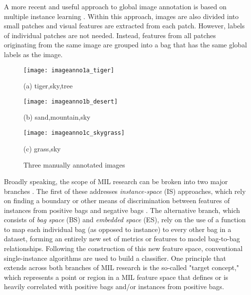 \documentclass[12pt,dvips]{report}
\numberwithin{equation}{section}
\begin{document}
A more recent and useful approach to global image annotation is based on multiple instance learning \cite{andrews2002support,ray2005supervised,chen06_miles,mcil14}.  Within this approach, images are also divided into small patches and visual features are extracted from each patch.  However, labels of individual patches are not needed.  Instead, features from all patches originating from the same image are grouped into a bag that has the same global labels as the image.  


\begin{figure}[htb]
\begin{minipage}[b]{.31\linewidth}
  \centering
  \centerline{\texttt{[image: imageanno1a\_tiger]}}
  \centerline{(a) tiger,sky,tree}
\end{minipage}
\begin{minipage}[b]{0.31\linewidth}
  \centering
  \centerline{\texttt{[image: imageanno1b\_desert]}}
  \centerline{(b) sand,mountain,sky}
\end{minipage}
\begin{minipage}[b]{0.31\linewidth}
  \centering
  \centerline{\texttt{[image: imageanno1c\_skygrass]}}
  \centerline{(c) grass,sky}

\end{minipage}
%
\caption{Three manually annotated images}
\label{fig:ImageAnnoIntro}
\end{figure}

Broadly speaking, the scope of MIL research can be broken into two major branches\cite{amor13} . The first of these addresses \emph{instance-space}\emph{} (IS) approaches, which rely on finding a boundary or other means of discrimination between features of instances from positive bags and negative bags \cite{maro98,diet97,zhang2001}. The alternative branch, which consists of \emph{bag space} (BS) and \emph{embedded space} (ES), rely on the use of a function to map each individual bag (as opposed to instance) to every other bag in a dataset, forming an entirely new set of metrics or features to model bag-to-bag relationships.  Following the construction of this  new feature space, conventional single-instance algorithms are used \cite{chen04_ddsvm,chen06_miles,Zhou2009IIDSamples} to build a classifier.  One principle that extends across both branches of MIL research is the so-called "target concept," which represents a point or region in a MIL feature space that defines or is heavily correlated with positive bags and/or instances from positive bags. 
 
\end{document}
